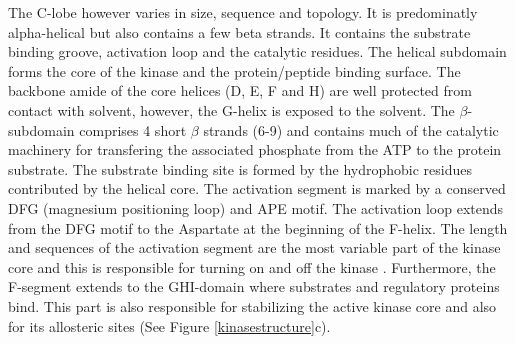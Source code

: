 \documentclass[a4paper, 11pt]{article}
\begin{document}
The C-lobe however varies in size, sequence and topology. It is predominatly alpha-helical but also contains a few beta strands. It contains the substrate binding groove, activation loop and the catalytic residues. The helical subdomain forms the core of the kinase and the protein/peptide binding surface. The backbone amide of the core helices (D, E, F and H) are well protected from contact with solvent, however, the G-helix is exposed to the solvent. The $\beta$-subdomain comprises 4 short $\beta$ strands (6-9) and contains much of the catalytic machinery for transfering the associated phosphate from the ATP to the protein substrate. The substrate binding site is formed by the hydrophobic residues contributed by the helical core. The activation segment is marked by a conserved DFG (magnesium positioning loop) and APE motif. The activation loop extends from the DFG motif to the Aspartate at the beginning of the F-helix. The length and sequences of the activation segment are the most variable part of the kinase core and this is responsible for turning on and off the kinase \cite{taylor2011protein}. Furthermore, the F-segment extends to the GHI-domain where substrates and regulatory proteins bind. This part is also responsible for stabilizing the active kinase core and also for its allosteric sites (See Figure \ref{kinasestructure}c).\\
\end{document}

